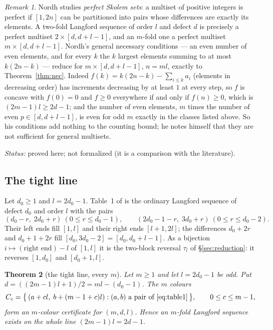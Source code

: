 \documentclass[11pt]{amsart}
\theoremstyle{plain}
\newtheorem{theorem}{Theorem}[section]
\theoremstyle{definition}
\theoremstyle{remark}
\newtheorem{remark}[theorem]{Remark}
\newcommand{\status}[1]{\par\smallskip
  {\small\raggedright\noindent\textit{Status:} #1\par}\smallskip}
\begin{document}
\begin{remark}\label{rem:nordh}
Nordh \cite{Nordh} studies \emph{perfect Skolem sets}: a multiset of positive integers
is perfect if $[1,2n]$ can be partitioned into pairs whose differences are exactly its
elements. A two-fold Langford sequence of order $l$ and defect $d$ is precisely a
perfect multiset $2 \times [d,d+l-1]$, and an $m$-fold one a perfect multiset
$m \times [d,d+l-1]$. Nordh's general necessary conditions --- an even number of even
elements, and for every $k$ the $k$ largest elements summing to at most $k(2n-k)$ ---
reduce for $m \times [d,d+l-1]$, $n = ml$, exactly to Theorem~\ref{thm:nec}. Indeed
$f(k) = k(2n-k) - \sum_{i \le k} a_i$ (elements in decreasing order) has increments
decreasing by at least $1$ at every step, so $f$ is concave with $f(0) = 0$ and
$f \ge 0$ everywhere if and only if $f(n) \ge 0$, which is $(2m-1)l \ge 2d-1$; and the
number of even elements, $m$ times the number of even $p \in [d,d+l-1]$, is even for
odd $m$ exactly in the classes listed above. So his conditions add nothing to the
counting bound; he notes himself that they are not sufficient for general multisets.
\end{remark}
\status{proved here; not formalized (it is a comparison with the literature).}

\subsection*{The tight line}
Let $d_0 \ge 1$ and $l = 2d_0 - 1$. Table~1 of \cite{ADH} is the ordinary Langford
sequence of defect $d_0$ and order $l$ with the pairs
\begin{equation}\label{eq:table1}
  (d_0 - r,\; 2d_0 + r) \ (0 \le r \le d_0-1), \qquad
  (2d_0 - 1 - r,\; 3d_0 + r) \ (0 \le r \le d_0-2).
\end{equation}
Their left ends fill $[1,l]$ and their right ends $[l+1,2l]$; the differences
$d_0+2r$ and $d_0+1+2r$ fill $[d_0, 3d_0-2] = [d_0, d_0+l-1]$. As a bijection
$i \mapsto (\text{right end}) - l$ of $[1,l]$ it is the two-block reversal $\tau_l$ of
\S\ref{sec:reduction}: it reverses $[1,d_0]$ and $[d_0+1,l]$.

\begin{theorem}[the tight line, every $m$]\label{thm:tight}
Let $m \ge 1$ and let $l = 2d_0-1$ be odd. Put $d = ((2m-1)l+1)/2 = ml - (d_0-1)$. The
$m$ colours
\[
  C_c = \bigl\{\,(a + cl,\; b + (m-1+c)l) : (a,b) \text{ a pair of } \eqref{eq:table1}\,\bigr\},
  \qquad 0 \le c \le m-1,
\]
form an $m$-colour certificate for $(m,d,l)$. Hence an $m$-fold Langford sequence exists
on the whole line $(2m-1)l = 2d-1$.
\end{theorem}
\end{document}
